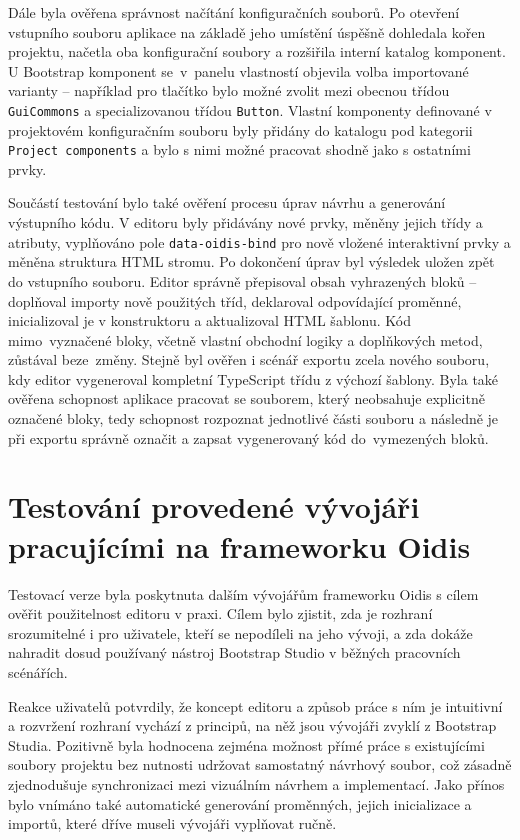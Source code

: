 Dále byla ověřena správnost načítání konfiguračních souborů. Po otevření vstupního souboru aplikace na základě jeho umístění úspěšně dohledala kořen projektu, načetla oba konfigurační soubory a rozšiřila interní katalog komponent. U Bootstrap komponent se~v~panelu vlastností objevila volba importované varianty -- například pro tlačítko bylo možné zvolit mezi obecnou třídou \texttt{GuiCommons} a specializovanou třídou \texttt{Button}. Vlastní komponenty definované v projektovém konfiguračním souboru byly přidány do katalogu pod kategorii \texttt{Project components} a bylo s nimi možné pracovat shodně jako s ostatními prvky.

Součástí testování bylo také ověření procesu úprav návrhu a generování výstupního kódu. V editoru byly přidávány nové prvky, měněny jejich třídy a atributy, vyplňováno pole \texttt{data-oidis-bind} pro nově vložené interaktivní prvky a měněna struktura HTML stromu. Po dokončení úprav byl výsledek uložen zpět do vstupního souboru. Editor správně přepisoval obsah vyhrazených bloků -- doplňoval importy nově použitých tříd, deklaroval odpovídající proměnné, inicializoval je v konstruktoru a aktualizoval HTML šablonu. Kód mimo~vyznačené bloky, včetně vlastní obchodní logiky a doplňkových metod, zůstával beze~změny. Stejně byl ověřen i scénář exportu zcela nového souboru, kdy editor vygeneroval kompletní TypeScript třídu z výchozí šablony. Byla také ověřena schopnost aplikace pracovat se souborem, který neobsahuje explicitně označené bloky, tedy schopnost rozpoznat jednotlivé části souboru a následně je při exportu správně označit a zapsat vygenerovaný kód do~vymezených bloků.

\section{Testování provedené vývojáři pracujícími na frameworku Oidis}

Testovací verze byla poskytnuta dalším vývojářům frameworku Oidis s cílem ověřit použitelnost editoru v praxi. Cílem bylo zjistit, zda je rozhraní srozumitelné i pro uživatele, kteří se nepodíleli na jeho vývoji, a zda dokáže nahradit dosud používaný nástroj Bootstrap Studio v běžných pracovních scénářích.

Reakce uživatelů potvrdily, že koncept editoru a způsob práce s ním je intuitivní a rozvržení rozhraní vychází z principů, na něž jsou vývojáři zvyklí z Bootstrap Studia. Pozitivně byla hodnocena zejména možnost přímé práce s existujícími soubory projektu bez nutnosti udržovat samostatný návrhový soubor, což zásadně zjednodušuje synchronizaci mezi vizuálním návrhem a implementací. Jako přínos bylo vnímáno také automatické generování proměnných, jejich inicializace a importů, které dříve museli vývojáři vyplňovat ručně.

